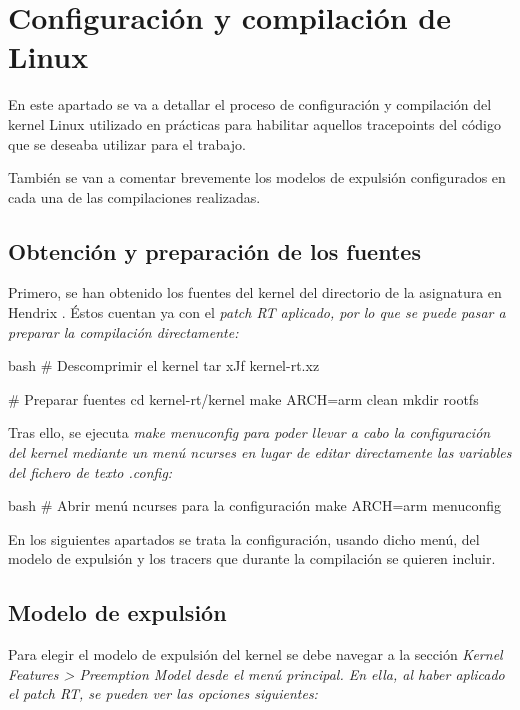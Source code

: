 \documentclass[../main.tex]{subfiles}
\begin{document}
\section{Configuración y compilación de Linux}

En este apartado se va a detallar el proceso de configuración y compilación del kernel Linux utilizado en prácticas para habilitar aquellos tracepoints del código que se deseaba utilizar para el trabajo.

También se van a comentar brevemente los modelos de expulsión configurados en cada una de las compilaciones realizadas.

\subsection{Obtención y preparación de los fuentes}

Primero, se han obtenido los fuentes del kernel del directorio de la asignatura en Hendrix \cite{fuentes-Linux}. Éstos cuentan ya con el \it{patch RT} aplicado, por lo que se puede pasar a preparar la compilación directamente:

\begin{codigo}{bash}
# Descomprimir el kernel
tar xJf kernel-rt.xz

# Preparar fuentes
cd kernel-rt/kernel
make ARCH=arm clean
mkdir rootfs
\end{codigo}

Tras ello, se ejecuta \it{make menuconfig} para poder llevar a cabo la configuración del kernel mediante un menú \it{ncurses} en lugar de editar directamente las variables del fichero de texto \it{.config}:

\begin{codigo}{bash}
# Abrir menú ncurses para la configuración
make ARCH=arm menuconfig
\end{codigo}

En los siguientes apartados se trata la configuración, usando dicho menú, del modelo de expulsión y los tracers que durante la compilación se quieren incluir.

\subsection{Modelo de expulsión}

Para elegir el modelo de expulsión del kernel se debe navegar a la sección \it{Kernel Features > Preemption Model} desde el menú principal. En ella, al haber aplicado el \it{patch RT}, se pueden ver las opciones siguientes:
\end{document}

